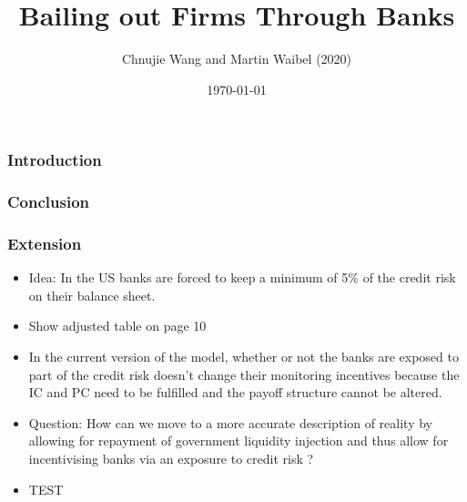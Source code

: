 \documentclass{beamer}
\begin{document}
	
\title{Bailing out Firms Through Banks}
\author{Chnujie Wang and Martin Waibel (2020)}
\date{\today}

 \renewcommand*\inserttotalframenumber{14	}

\begin{frame}
\maketitle
\end{frame}


\begin{frame}
\frametitle{Introduction}
\end{frame}

\begin{frame}
\frametitle{Conclusion}
\end{frame}

\begin{frame}
\frametitle{Extension}
\begin{itemize}
	\item Idea: In the US banks are forced to keep a minimum of 5\% of the credit risk on their balance sheet. 

	\item Show adjusted table on page 10 

	\item In the current version of the model, whether or not the banks are exposed to part of the credit risk doesn't change their monitoring incentives because the IC and PC need to be fulfilled and the payoff structure cannot be altered. 

	\item Question: How can we move to a more accurate description of reality by allowing for repayment of government liquidity injection and thus allow for incentivising banks via an exposure to credit risk ?


	\item TEST
\end{itemize}

\end{frame}
\end{document}
